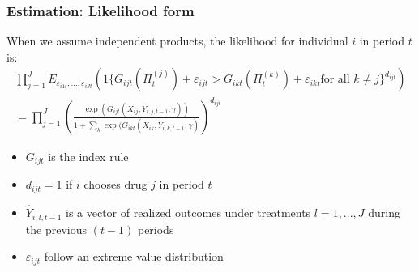 
\begin{frame}[label=ESTIMATION]

\frametitle{Estimation: Likelihood form}

When we assume independent products, the likelihood for individual $i$ in
period $t$ is:%
\begin{multline*}
\prod_{j=1}^{J}E_{\varepsilon _{i1t},...,\varepsilon _{iJt}}(1\{G_{ijt}(\Pi
_{t}^{(j)})+\varepsilon_{ijt}>G_{ikt}(\Pi _{t}^{(k)})+\varepsilon_{ikt}\text{
for all }k\neq j\}^{d_{ijt}}) \\
=\prod_{j=1}^{J}\left( \frac{\exp (G_{ijt}(X_{ij},\widehat{Y}%
_{i,j,t-1};\gamma ))}{1+\sum_{k}\exp (G_{ikt}(X_{ik},\widehat{Y}%
_{i,k,t-1};\gamma )}\right) ^{d_{ijt}}
\end{multline*}

\begin{itemize}
\item $G_{ijt}$ is the index rule

\item $d_{ijt}=1$ if $i$ chooses drug $j$ in period $t$

\item $\widehat{Y}_{i,l,t-1}$ is a vector of realized outcomes under
treatments $l=1,...,J$ during the previous $(t-1)$ periods

\item $\varepsilon _{ijt}$ follow an extreme value distribution
\end{itemize}
\end{frame}



